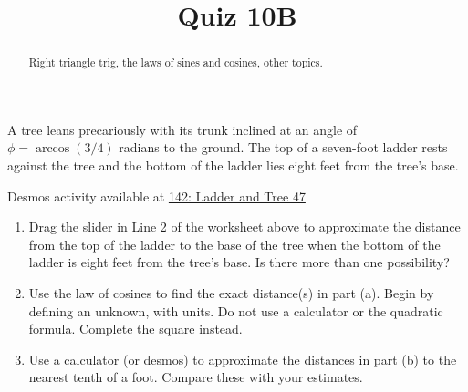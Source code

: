 \documentclass{ximera}
\title{Quiz 10B}
\begin{document}
\begin{abstract}
Right triangle trig, the laws of sines and cosines, other topics.
\end{abstract}
\maketitle


\begin{question} \label{QLMVVEVEeddf}
A tree leans precariously with its trunk inclined at an angle of $\phi=\arccos(3/4)$ radians to the ground. The top of a seven-foot ladder rests against the tree and the bottom of the ladder lies eight feet from the tree's base. %

\begin{onlineOnly}
    \begin{center}
\end{center}
\end{onlineOnly}

Desmos activity available at \href{https://www.desmos.com/calculator/8bbcfyrita}{142: Ladder and Tree 47}

\begin{enumerate}
\item Drag the slider in Line 2 of the worksheet above to approximate the distance from the top of the ladder to the base of the tree when the bottom of the ladder is eight feet from the tree's base. Is there more than one possibility?

\item Use the law of cosines to find the exact distance(s) in part (a). Begin by defining an unknown, with units. Do not use a calculator or the quadratic formula. Complete the square instead.

\item Use a calculator (or desmos) to approximate the distances in part (b) to the nearest tenth of a foot. Compare these with your estimates.
\end{enumerate}
\end{question}
\end{document}

